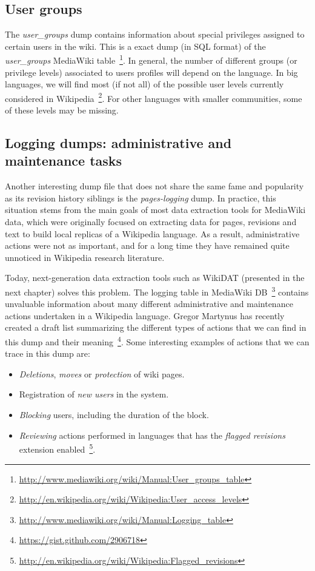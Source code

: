 \subsection{User groups}
The \textit{user\_groups} dump contains information about special privileges
assigned to certain users in the wiki. This is a exact dump (in SQL format) of
the \textit{user\_groups} MediaWiki 
table~\footnote{\url{http://www.mediawiki.org/wiki/Manual:User_groups_table}}. In
general, the number of different groups (or privilege levels) associated to users
profiles will depend on the language. In big languages, we will find most (if not
all) of the possible user levels currently considered in 
Wikipedia~\footnote{\url{http://en.wikipedia.org/wiki/Wikipedia:User_access_levels}}. For
other languages with smaller communities, some of these levels may be missing.

\subsection{Logging dumps: administrative and maintenance tasks}
Another interesting dump file that does not share the same fame and popularity as
its revision history siblings is the \textit{pages-logging} dump. In practice, this
situation stems from the main goals of most data extraction tools for MediaWiki
data, which were originally focused on extracting data for pages, revisions and text
to build local replicas of a Wikipedia language. As a result, administrative
actions were not as important, and for a long time they have remained quite unnoticed
in Wikipedia research literature.

Today, next-generation data extraction tools such as WikiDAT (presented in the
next chapter) solves this problem. The logging table in 
MediaWiki DB~\footnote{\url{http://www.mediawiki.org/wiki/Manual:Logging_table}}
contains unvaluable information about many different administrative and maintenance
actions undertaken in a Wikipedia language. Gregor Martynus has recently created
a draft list summarizing the different types of actions that we can find in this
dump and their meaning~\footnote{\url{https://gist.github.com/2906718}}. 
Some interesting examples of actions that we can trace
in this dump are:

\begin{itemize}
 \item \textit{Deletions}, \textit{moves} or \textit{protection} of wiki pages.
 \item Registration of \textit{new users} in the system.
 \item \textit{Blocking} users, including the duration of the block.
 \item \textit{Reviewing} actions performed in languages that has the \textit{flagged revisions}
extension enabled~\footnote{\url{http://en.wikipedia.org/wiki/Wikipedia:Flagged_revisions}}.
\end{itemize}

